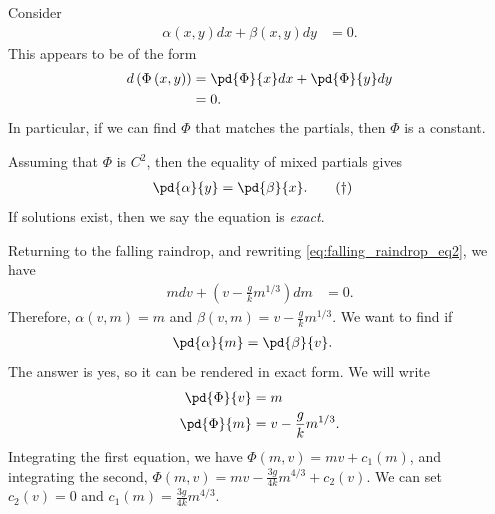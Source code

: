 \documentclass[10pt]{mypackage}
\begin{document}
  \begin{example}
    Consider 
    \begin{align*}
      \alpha\left( x,y \right)dx + \beta\left( x,y \right)dy &= 0.
    \end{align*}
    This appears to be of the form
    \begin{align*}
      d\left( \Phi\left( x,y \right) \right) &= \pd{\Phi}{x}dx + \pd{\Phi}{y}dy\\
                                             &= 0.
    \end{align*}
    In particular, if we can find $\Phi$ that matches the partials, then $\Phi$ is a constant.\newline

    Assuming that $\Phi$ is $C^2$, then the equality of mixed partials gives
    \begin{align*}
      \pd{\alpha}{y} &= \pd{\beta}{x}.\label{eq:exact_inexact}\tag{$\dag$}
    \end{align*}
    If solutions exist, then we say the equation is \textit{exact}.\newline

    Returning to the falling raindrop, and rewriting \eqref{eq:falling_raindrop_eq2}, we have
    \begin{align*}
      mdv + \left( v-\frac{g}{k}m^{1/3} \right)dm &= 0.\label{eq:falling_raindrop_eq3}\tag{$\ddagger$}
    \end{align*}
    Therefore, $\alpha(v,m) = m$ and $\beta(v,m) = v- \frac{g}{k}m^{1/3}$. We want to find if
    \begin{align*}
      \pd{\alpha}{m} &= \pd{\beta}{v}.
    \end{align*}
    The answer is yes, so it can be rendered in exact form. We will write
    \begin{align*}
      \pd{\Phi}{v} &= m\\
      \pd{\Phi}{m} &= v - \frac{g}{k}m^{1/3}.
    \end{align*}
    Integrating the first equation, we have $\Phi(m,v) = mv + c_1(m)$, and integrating the second, $\Phi(m,v) = mv-\frac{3g}{4k}m^{4/3} + c_2(v)$. We can set $c_2(v) = 0$ and $c_1(m) = \frac{3g}{4k}m^{4/3}$.
  \end{example}
\end{document}
